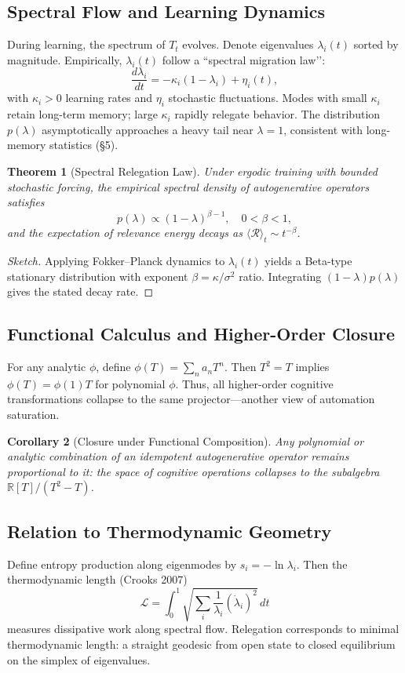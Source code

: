 \documentclass[12pt,a4paper,twoside,openright]{book}
\newtheorem{theorem}{Theorem}
\newtheorem{corollary}[theorem]{Corollary}
\begin{document}
\subsection{Spectral Flow and Learning Dynamics}
During learning, the spectrum of $T_t$ evolves.
Denote eigenvalues $\lambda_i(t)$ sorted by magnitude.
Empirically, $\lambda_i(t)$ follow a ``spectral migration law’’:
\[
\frac{d\lambda_i}{dt} = -\kappa_i (1-\lambda_i) + \eta_i(t),
\]
with $\kappa_i>0$ learning rates and $\eta_i$ stochastic fluctuations.
Modes with small $\kappa_i$ retain long-term memory; large $\kappa_i$ rapidly relegate behavior.
The distribution $p(\lambda)$ asymptotically approaches a heavy tail near $\lambda=1$, consistent with long-memory statistics (§5).

\begin{theorem}[Spectral Relegation Law]
Under ergodic training with bounded stochastic forcing, the empirical spectral density of autogenerative operators satisfies
\[
p(\lambda)\propto (1-\lambda)^{\beta-1},\quad 0<\beta<1,
\]
and the expectation of relevance energy decays as $\langle\mathcal{R}\rangle_t \sim t^{-\beta}$.
\end{theorem}

\begin{proof}[Sketch]
Applying Fokker–Planck dynamics to $\lambda_i(t)$ yields a Beta-type stationary distribution with exponent $\beta=\kappa/\sigma^2$ ratio.
Integrating $(1-\lambda)p(\lambda)$ gives the stated decay rate.
\end{proof}

\subsection{Functional Calculus and Higher-Order Closure}
For any analytic $\phi$, define $\phi(T)=\sum_n a_n T^n$.
Then $T^2=T$ implies $\phi(T)=\phi(1)T$ for polynomial $\phi$.
Thus, all higher-order cognitive transformations collapse to the same projector—another view of automation saturation.

\begin{corollary}[Closure under Functional Composition]
Any polynomial or analytic combination of an idempotent autogenerative operator remains proportional to it: the space of cognitive operations collapses to the subalgebra $\mathbb{R}[T]/(T^2-T)$.
\end{corollary}

\subsection{Relation to Thermodynamic Geometry}
Define entropy production along eigenmodes by $s_i=-\ln \lambda_i$.
Then the thermodynamic length (Crooks 2007)
\[
\mathcal{L}=\int_0^1 \sqrt{\sum_i \frac{1}{\lambda_i}(\dot{\lambda}_i)^2}\,dt
\]
measures dissipative work along spectral flow.
Relegation corresponds to minimal thermodynamic length: a straight geodesic from open state to closed equilibrium on the simplex of eigenvalues.
\end{document}
